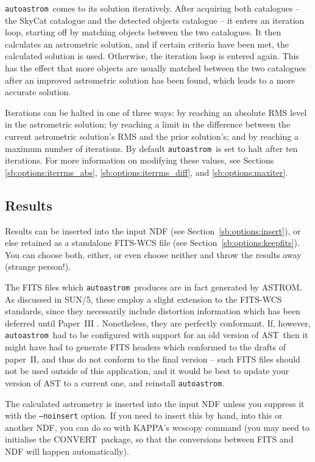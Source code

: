 \documentclass[twoside,11pt]{article}
\newcommand{\xref}[3]{#1}
\newcommand{\xlabel}[1]{}
\newcommand{\AST}{\xref{{\footnotesize AST}}{sun210}{}}
\newcommand{\ASTROM}{{\footnotesize ASTROM}\normalsize}
\newcommand{\autoastrom}{\texttt{autoastrom}}
\newcommand{\CONVERT}{{\footnotesize CONVERT}\normalsize}
\newcommand{\KAPPA}{{\footnotesize KAPPA}\normalsize}
\begin{document}
\autoastrom\ comes to its solution iteratively. After acquiring both
catalogues -- the SkyCat catalogue and the detected objects catalogue -- it
enters an iteration loop, starting off by matching objects between the two
catalogues. It then calculates an astrometric solution, and if certain
criteria have been met, the calculated solution is used. Otherwise, the
iteration loop is entered again. This has the effect that more objects are
usually matched between the two catalogues after an improved astrometric
solution has been found, which leads to a more accurate solution.

Iterations can be halted in one of three ways: by reaching an absolute RMS
level in the astrometric solution; by reaching a limit in the difference
between the current astrometric solution's RMS and the prior solution's; and
by reaching a maximum number of iterations. By default \autoastrom\ is set to
halt after ten iterations. For more information on modifying these values, see
Sections \ref{sb:options:iterrms_abs}, \ref{sb:options:iterrms_diff}, and
\ref{sb:options:maxiter}.

\subsection{\xlabel{sb_results}Results\label{sb:results}}

Results can be inserted into the input NDF (see
Section~\ref{sb:options:insert}), or else retained as a standalone FITS-WCS
file (see Section~\ref{sb:options:keepfits}).  You can choose both, either, or
even choose neither and throw the results away (strange person!).

The FITS files which \autoastrom\ produces are in fact generated by \ASTROM.
As discussed in SUN/5, these employ a slight extension to the FITS-WCS
standards, since they necessarily include distortion information which has
been deferred until Paper~III \cite{fitswcs3}.  Nonetheless, they are
perfectly conformant.  If, however, \autoastrom\ had to be configured with
support for an old version of \AST\, then it might have had to generate FITS
headers which conformed to the drafts of paper~II, and thus do not conform to
the final version -- such FITS files should not be used outside of this
application, and it would be best to update your version of AST to a current
one, and reinstall \autoastrom.

The calculated astrometry is inserted into the input NDF unless you suppress
it with the \texttt{--noinsert} option.  If you need to insert this by hand,
into this or another NDF, you can do so with \KAPPA's wcscopy command (you may
need to initialise the \CONVERT\ package, so that the conversions between FITS
and NDF will happen automatically).
\end{document}
